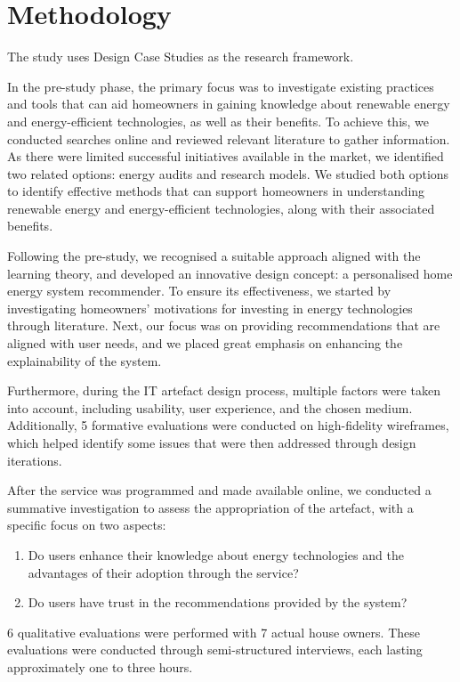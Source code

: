 \chapter{Methodology} 

The study uses Design Case Studies \cite{dcs} as the research framework. 

In the pre-study phase, 
the primary focus was to investigate existing practices and tools that can aid homeowners in gaining knowledge about renewable energy and energy-efficient technologies, as well as their benefits. 
To achieve this, we conducted searches online and reviewed relevant literature to gather information. 
As there were limited successful initiatives available in the market, we identified two related options: energy audits and research models. 
We studied both options to identify effective methods that can support homeowners in understanding renewable energy and energy-efficient technologies, along with their associated benefits.

Following the pre-study, 
we recognised a suitable approach aligned with the learning theory, 
and developed an innovative design concept: a personalised home energy system recommender.
To ensure its effectiveness, 
we started by investigating homeowners' motivations for investing in energy technologies through literature. 
Next, our focus was on providing recommendations that are aligned with user needs, 
and we placed great emphasis on enhancing the explainability of the system.

Furthermore, during the IT artefact design process, 
multiple factors were taken into account, including usability, user experience, and the chosen medium. 
Additionally, 5 formative evaluations were conducted on high-fidelity wireframes, 
which helped identify some issues that were then addressed through design iterations. 

After the service was programmed and made available online, 
we conducted a summative investigation to assess the appropriation of the artefact,
with a specific focus on two aspects:
\begin{enumerate}
    \item Do users enhance their knowledge about energy technologies and the advantages of their adoption through the service?
    \item Do users have trust in the recommendations provided by the system?
\end{enumerate}
6 qualitative evaluations were performed with 7 actual house owners. 
These evaluations were conducted through semi-structured interviews, 
each lasting approximately one to three hours. 

